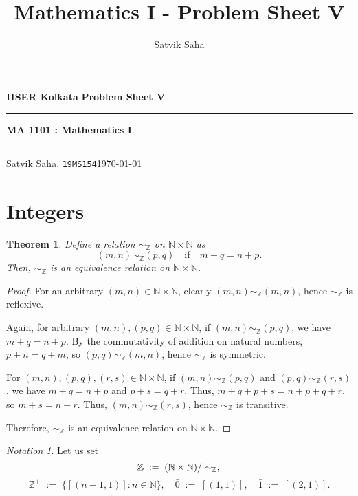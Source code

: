 \documentclass[10pt]{article}
\title{Mathematics I - Problem Sheet V}
\author{Satvik Saha}
\date{}
\newtheorem{theorem}{Theorem}[section]
\theoremstyle{definition}
\theoremstyle{remark}
\newtheorem*{notation}{Notation}
\newcommand{\N}{\mathbb{N}}
\newcommand{\Z}{\mathbb{Z}}
\newcommand{\simZ}{\sim_{\Z}}
\begin{document}
        \setlength\parindent{0pt}
        \par\textbf{IISER Kolkata} \hfill \textbf{Problem Sheet V}
        \vspace{3pt}
        \hrule
        \vspace{3pt}
        \begin{center}
                \LARGE{\textbf{MA 1101 : Mathematics I}}
        \end{center}
        \vspace{3pt}
        \hrule
        \vspace{3pt}
        Satvik Saha, \texttt{19MS154}\hfill\today
        \vspace{20pt}
        \setlength\parindent{15pt}

        \section{Integers}
        \begin{theorem}
        Define a relation $\simZ$ on $\N\times \N$ as
        \[(m, n) \simZ (p, q) \quad\text{if}\quad m + q = n + p. \]
        Then, $\simZ$ is an equivalence relation on $\N\times \N$.
        \end{theorem}
        \begin{proof}
                For an arbitrary $(m, n) \in \N\times \N$, clearly $(m, n) \simZ (m, n)$, hence $\simZ $ is reflexive.

                Again, for arbitrary $(m, n), (p, q) \in \N\times \N$, if
                $(m, n) \simZ (p, q)$, we have $m + q = n + p$.
                By the commutativity of addition on natural numbers, $p + n = q + m$, so 
                $(p, q) \simZ (m, n) $, hence $\simZ$ is symmetric.

                For $(m, n), (p, q), (r, s) \in \N\times \N$, if
                $(m, n) \simZ (p, q)$ and $(p, q) \simZ (r, s)$, we have
                $m + q = n + p$ and $p + s = q + r$. Thus, 
                $m + q + p + s = n + p + q + r$, so $m + s = n + r$.
                Thus, $(m, n) \simZ (r, s)$, hence $\simZ$ is transitive.

                Therefore, $\simZ$ is an equivalence relation on $\N\times \N$.
        \end{proof}

        \begin{notation}
        Let us set
        \[
                \Z \;:=\; (\N \times \N)/\simZ,\\
        \]
        \[
                \Z^+ \;:=\; \{[(n + 1, 1)] : n \in \N\}, \quad
                \bar{0} \;:=\; [(1, 1)], \quad
                \bar{1} \;:=\; [(2, 1)].
        \]
        \end{notation}
\end{document}
